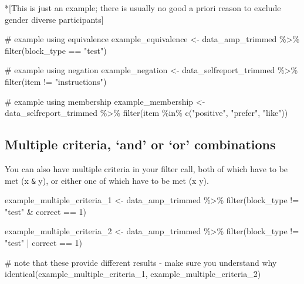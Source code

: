 \documentclass[
  letterpaper,
  DIV=11,
  numbers=noendperiod]{scrreprt}
\newenvironment{Shaded}{\begin{snugshade}}{\end{snugshade}}
\newcommand{\CommentTok}[1]{\textcolor[rgb]{0.37,0.37,0.37}{#1}}
\newcommand{\DecValTok}[1]{\textcolor[rgb]{0.68,0.00,0.00}{#1}}
\newcommand{\FunctionTok}[1]{\textcolor[rgb]{0.28,0.35,0.67}{#1}}
\newcommand{\NormalTok}[1]{\textcolor[rgb]{0.00,0.23,0.31}{#1}}
\newcommand{\OtherTok}[1]{\textcolor[rgb]{0.00,0.23,0.31}{#1}}
\newcommand{\SpecialCharTok}[1]{\textcolor[rgb]{0.37,0.37,0.37}{#1}}
\newcommand{\StringTok}[1]{\textcolor[rgb]{0.13,0.47,0.30}{#1}}
\begin{document}
*{[}This is just an example; there is usually no good a priori reason to
exclude gender diverse participants{]}

\begin{Shaded}
\begin{Highlighting}[]
\CommentTok{\# example using equivalence}
\NormalTok{example\_equivalence }\OtherTok{\textless{}{-}}\NormalTok{ data\_amp\_trimmed }\SpecialCharTok{\%\textgreater{}\%}
  \FunctionTok{filter}\NormalTok{(block\_type }\SpecialCharTok{==} \StringTok{"test"}\NormalTok{)}

\CommentTok{\# example using negation}
\NormalTok{example\_negation }\OtherTok{\textless{}{-}}\NormalTok{ data\_selfreport\_trimmed }\SpecialCharTok{\%\textgreater{}\%}
  \FunctionTok{filter}\NormalTok{(item }\SpecialCharTok{!=} \StringTok{"instructions"}\NormalTok{)}

\CommentTok{\# example using membership}
\NormalTok{example\_membership }\OtherTok{\textless{}{-}}\NormalTok{ data\_selfreport\_trimmed }\SpecialCharTok{\%\textgreater{}\%}
  \FunctionTok{filter}\NormalTok{(item }\SpecialCharTok{\%in\%} \FunctionTok{c}\NormalTok{(}\StringTok{"positive"}\NormalTok{, }\StringTok{"prefer"}\NormalTok{, }\StringTok{"like"}\NormalTok{))}
\end{Highlighting}
\end{Shaded}

\subsection{Multiple criteria, `and' or `or'
combinations}\label{multiple-criteria-and-or-or-combinations}

You can also have multiple criteria in your filter call, both of which
have to be met (x \texttt{\&} y), or either one of which have to be met
(x \texttt{\textbar{}} y).

\begin{Shaded}
\begin{Highlighting}[]
\NormalTok{example\_multiple\_criteria\_1 }\OtherTok{\textless{}{-}}\NormalTok{ data\_amp\_trimmed }\SpecialCharTok{\%\textgreater{}\%}
  \FunctionTok{filter}\NormalTok{(block\_type }\SpecialCharTok{!=} \StringTok{"test"} \SpecialCharTok{\&}\NormalTok{ correct }\SpecialCharTok{==} \DecValTok{1}\NormalTok{)}

\NormalTok{example\_multiple\_criteria\_2 }\OtherTok{\textless{}{-}}\NormalTok{ data\_amp\_trimmed }\SpecialCharTok{\%\textgreater{}\%}
  \FunctionTok{filter}\NormalTok{(block\_type }\SpecialCharTok{!=} \StringTok{"test"} \SpecialCharTok{|}\NormalTok{ correct }\SpecialCharTok{==} \DecValTok{1}\NormalTok{)}

\CommentTok{\# note that these provide different results {-} make sure you understand why}
\FunctionTok{identical}\NormalTok{(example\_multiple\_criteria\_1, example\_multiple\_criteria\_2)}
\end{Highlighting}
\end{Shaded}
\end{document}
